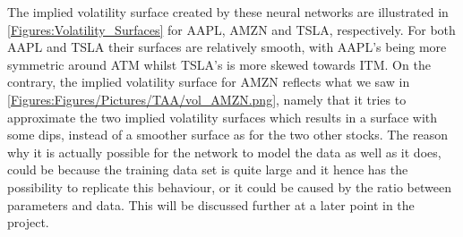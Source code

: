 \begin{table}[H]
    \centering
    \hfill
    \hfill
    \hfill
    \caption{MSE, MAE and MAPE the the test set of AAPL, AMZN and TSLA.}
    \label{Tab:APP:MSE MAE MAPE}
\end{table}

The implied volatility surface created by these neural networks are illustrated in \autoref{Figures:Volatility_Surfaces} for AAPL, AMZN and TSLA, respectively. For both AAPL and TSLA their surfaces are relatively smooth, with AAPL's being more symmetric around ATM whilst TSLA's is more skewed towards ITM. On the contrary, the implied volatility surface for AMZN reflects what we saw in \autoref{Figures:Figures/Pictures/TAA/vol_AMZN.png}, namely that it tries to approximate the two implied volatility surfaces which results in a surface with some dips, instead of a smoother surface as for the two other stocks. The reason why it is actually possible for the network to model the data as well as it does, could be because the training data set is quite large and it hence has the possibility to replicate this behaviour, or it could be caused by the ratio between parameters and data. This will be discussed further at a later point in the project. 


